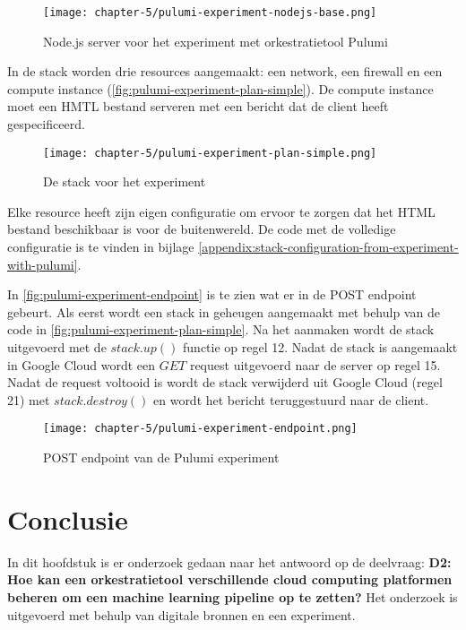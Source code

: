 \begin{figure}[hbt!]
  \centering
  \texttt{[image: chapter-5/pulumi-experiment-nodejs-base.png]}
  \caption{Node.js server voor het experiment met orkestratietool Pulumi}
  \label{fig:pulumi-experiment-nodejs-base}
\end{figure}

In de stack worden drie resources aangemaakt: een network, een firewall en een compute instance (\autoref{fig:pulumi-experiment-plan-simple}). De compute instance moet een HMTL bestand serveren met een bericht dat de client heeft gespecificeerd. 

\begin{figure}[hbt!]
  \centering
  \texttt{[image: chapter-5/pulumi-experiment-plan-simple.png]}
  \caption{De stack voor het experiment}
  \label{fig:pulumi-experiment-plan-simple}
\end{figure}

Elke resource heeft zijn eigen configuratie om ervoor te zorgen dat het HTML bestand beschikbaar is voor de buitenwereld. De code met de volledige configuratie is te vinden in bijlage \ref{appendix:stack-configuration-from-experiment-with-pulumi}.

In \autoref{fig:pulumi-experiment-endpoint} is te zien wat er in de POST endpoint gebeurt. Als eerst wordt een stack in geheugen aangemaakt met behulp van de code in \autoref{fig:pulumi-experiment-plan-simple}. Na het aanmaken wordt de stack uitgevoerd met de \(stack.up()\) functie op regel 12. Nadat de stack is aangemaakt in Google Cloud wordt een \(GET\) request uitgevoerd naar de server op regel 15. Nadat de request voltooid is wordt de stack verwijderd uit Google Cloud (regel 21) met \(stack.destroy()\) en wordt het bericht teruggestuurd naar de client.

\begin{figure}[hbt!]
  \centering
  \texttt{[image: chapter-5/pulumi-experiment-endpoint.png]}
  \caption{POST endpoint van de Pulumi experiment}
  \label{fig:pulumi-experiment-endpoint}
\end{figure}

\section{Conclusie}\label{subsec:ch5-conclusie}
In dit hoofdstuk is er onderzoek gedaan naar het antwoord op de deelvraag: \textbf{D2: Hoe kan een orkestratietool verschillende cloud computing platformen beheren om een machine learning pipeline op te zetten?} Het onderzoek is uitgevoerd met behulp van digitale bronnen en een experiment.


